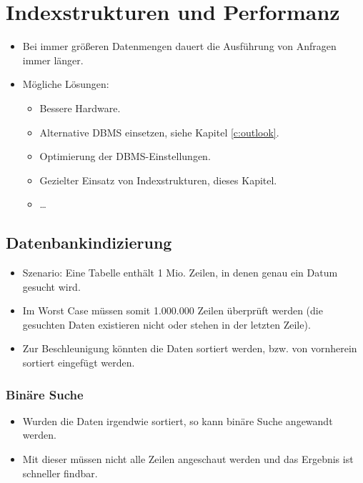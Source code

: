 \chapter{Indexstrukturen und Performanz} %
	\label{c:performance}

	\begin{itemize}
		\item Bei immer größeren Datenmengen dauert die Ausführung von Anfragen immer länger.
		\item Mögliche Lösungen:
			\begin{itemize}
				\item Bessere Hardware.
				\item Alternative DBMS einsetzen, siehe Kapitel \ref{c:outlook}.
				\item Optimierung der DBMS-Einstellungen.
				\item Gezielter Einsatz von Indexstrukturen, dieses Kapitel.
				\item \dots
			\end{itemize}
	\end{itemize}

	\section{Datenbankindizierung} %
		\begin{itemize}
			\item Szenario: Eine Tabelle enthält 1 Mio. Zeilen, in denen genau ein Datum gesucht wird.
			\item Im Worst Case müssen somit 1.000.000 Zeilen überprüft werden (die gesuchten Daten existieren nicht oder stehen in der letzten Zeile).
			\item Zur Beschleunigung könnten die Daten sortiert werden, bzw. von vornherein sortiert eingefügt werden.
		\end{itemize}

		\subsection{Binäre Suche} %
			\begin{itemize}
				\item Wurden die Daten irgendwie sortiert, so kann binäre Suche angewandt werden.
				\item Mit dieser müssen nicht alle Zeilen angeschaut werden und das Ergebnis ist schneller findbar.
			\end{itemize}

